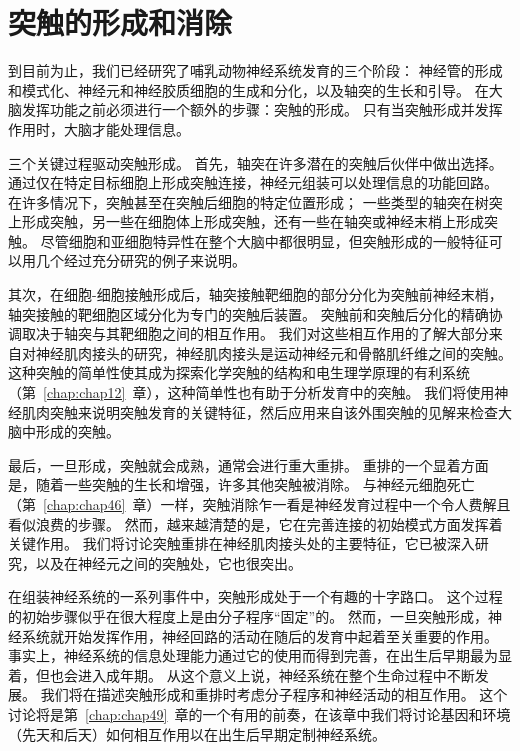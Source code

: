 \chapter{突触的形成和消除} \label{chap:chap48}

到目前为止，我们已经研究了哺乳动物神经系统发育的三个阶段：
神经管的形成和模式化、神经元和神经胶质细胞的生成和分化，以及轴突的生长和引导。
在大脑发挥功能之前必须进行一个额外的步骤：突触的形成。
只有当突触形成并发挥作用时，大脑才能处理信息。


三个关键过程驱动突触形成。
首先，轴突在许多潜在的突触后伙伴中做出选择。
通过仅在特定目标细胞上形成突触连接，神经元组装可以处理信息的功能回路。
在许多情况下，突触甚至在突触后细胞的特定位置形成；
一些类型的轴突在树突上形成突触，另一些在细胞体上形成突触，还有一些在轴突或神经末梢上形成突触。
尽管细胞和亚细胞特异性在整个大脑中都很明显，但突触形成的一般特征可以用几个经过充分研究的例子来说明。


其次，在细胞-细胞接触形成后，轴突接触靶细胞的部分分化为突触前神经末梢，轴突接触的靶细胞区域分化为专门的突触后装置。
突触前和突触后分化的精确协调取决于轴突与其靶细胞之间的相互作用。
我们对这些相互作用的了解大部分来自对神经肌肉接头的研究，神经肌肉接头是运动神经元和骨骼肌纤维之间的突触。
这种突触的简单性使其成为探索化学突触的结构和电生理学原理的有利系统（第~\ref{chap:chap12}~章），这种简单性也有助于分析发育中的突触。
我们将使用神经肌肉突触来说明突触发育的关键特征，然后应用来自该外围突触的见解来检查大脑中形成的突触。


最后，一旦形成，突触就会成熟，通常会进行重大重排。
重排的一个显着方面是，随着一些突触的生长和增强，许多其他突触被消除。
与神经元细胞死亡（第~\ref{chap:chap46}~章）一样，突触消除乍一看是神经发育过程中一个令人费解且看似浪费的步骤。
然而，越来越清楚的是，它在完善连接的初始模式方面发挥着关键作用。
我们将讨论突触重排在神经肌肉接头处的主要特征，它已被深入研究，以及在神经元之间的突触处，它也很突出。


在组装神经系统的一系列事件中，突触形成处于一个有趣的十字路口。
这个过程的初始步骤似乎在很大程度上是由分子程序“固定”的。
然而，一旦突触形成，神经系统就开始发挥作用，神经回路的活动在随后的发育中起着至关重要的作用。
事实上，神经系统的信息处理能力通过它的使用而得到完善，在出生后早期最为显着，但也会进入成年期。
从这个意义上说，神经系统在整个生命过程中不断发展。 我们将在描述突触形成和重排时考虑分子程序和神经活动的相互作用。
这个讨论将是第~\ref{chap:chap49}~章的一个有用的前奏，在该章中我们将讨论基因和环境（先天和后天）如何相互作用以在出生后早期定制神经系统。




